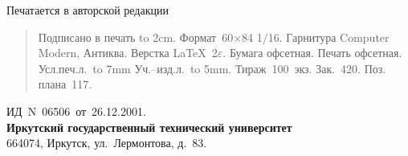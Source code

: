 \documentclass[12pt, openany, twoside]{book} %
\begin{document}
\newpage
\thispagestyle{empty}
\hbox{}
\vfill
\begin{center}
Печатается в авторской редакции\\[1em]
\end{center}
\begin{quote}
\noindent Подписано в печать \hbox to 2cm{}.
Формат~60$\times$84 1/16. Гарнитура Computer Modern, Антиква.
Верстка \LaTeX~2$\varepsilon$.
Бумага офсетная. Печать офсетная. Усл.печ.л.~\hbox to 7mm{}
Уч.--изд.л.~\hbox to 5mm{}. Тираж~100~экз. Зак.~420.
Поз. плана~117.
\end{quote}
\begin{center}
ИД~N~06506~от~26.12.2001.\\
{\bf Иркутский государственный технический университет}\\
664074, Иркутск, ул.~Лермонтова, д.~83.
\end{center}
\end{document}
